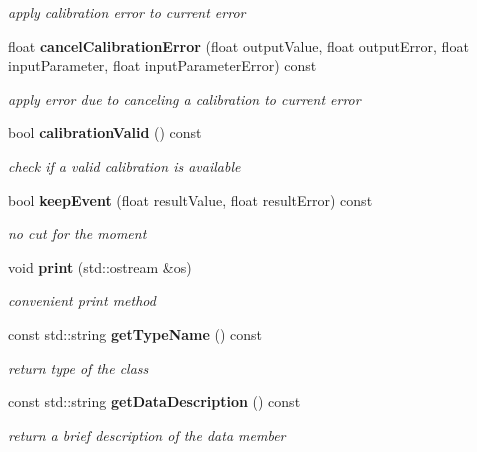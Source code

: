 \begin{DoxyCompactItemize}
\begin{DoxyCompactList}\small\item\em apply calibration error to current error \item\end{DoxyCompactList}\item 
float {\bf cancelCalibrationError} (float outputValue, float outputError, float inputParameter, float inputParameterError) const \label{classCALICE_1_1SaturationConstants_a19d0bb585843573555df4e63c6038acd}

\begin{DoxyCompactList}\small\item\em apply error due to canceling a calibration to current error \item\end{DoxyCompactList}\item 
bool {\bf calibrationValid} () const \label{classCALICE_1_1SaturationConstants_a7fdebcaa3ebf3b099aa11524e347ace3}

\begin{DoxyCompactList}\small\item\em check if a valid calibration is available \item\end{DoxyCompactList}\item 
bool {\bf keepEvent} (float resultValue, float resultError) const \label{classCALICE_1_1SaturationConstants_a4df07d49bfccab7e7586bffddee8583c}

\begin{DoxyCompactList}\small\item\em no cut for the moment \item\end{DoxyCompactList}\item 
void {\bf print} (std::ostream \&os)\label{classCALICE_1_1SaturationConstants_a874667af6a08bd188c53dfa36757b915}

\begin{DoxyCompactList}\small\item\em convenient print method \item\end{DoxyCompactList}\item 
const std::string {\bf getTypeName} () const \label{classCALICE_1_1SaturationConstants_a6868223cd0a1232d1cafee7032f47fc0}

\begin{DoxyCompactList}\small\item\em return type of the class \item\end{DoxyCompactList}\item 
const std::string {\bf getDataDescription} () const \label{classCALICE_1_1SaturationConstants_a1f4ea94ddbcb2aed522fc35ea20a8d78}

\begin{DoxyCompactList}\small\item\em return a brief description of the data member \item\end{DoxyCompactList}\end{DoxyCompactItemize}


